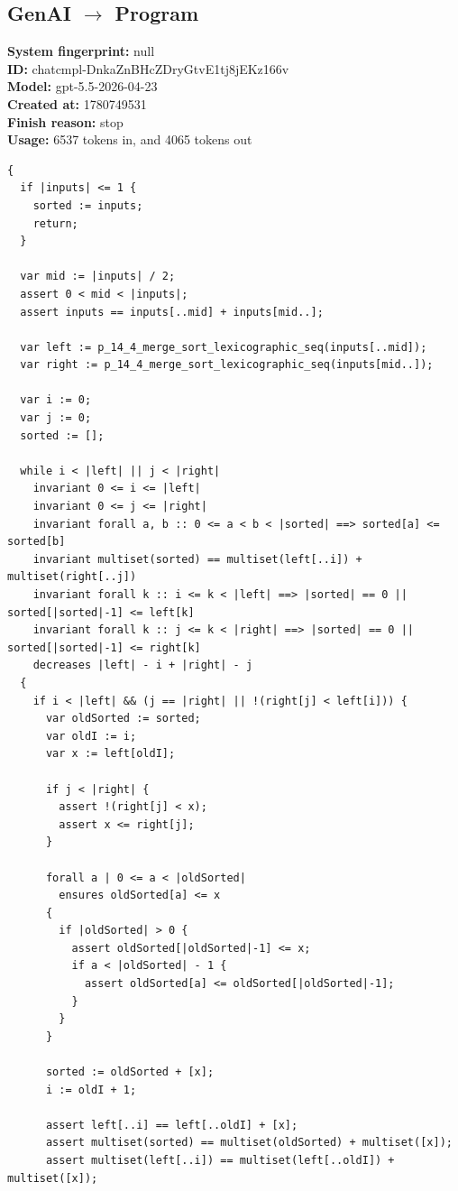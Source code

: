 \documentclass{article}
\begin{document}
\subsection*{GenAI $\rightarrow$ Program}
\textbf{System fingerprint: }null
\\\textbf{ID: }chatcmpl-DnkaZnBHcZDryGtvE1tj8jEKz166v
\\\textbf{Model: }gpt-5.5-2026-04-23
\\\textbf{Created at: }1780749531
\\\textbf{Finish reason: }stop
\\\textbf{Usage: }6537 tokens in, and 4065 tokens out
\begin{lstlisting}
{
  if |inputs| <= 1 {
    sorted := inputs;
    return;
  }

  var mid := |inputs| / 2;
  assert 0 < mid < |inputs|;
  assert inputs == inputs[..mid] + inputs[mid..];

  var left := p_14_4_merge_sort_lexicographic_seq(inputs[..mid]);
  var right := p_14_4_merge_sort_lexicographic_seq(inputs[mid..]);

  var i := 0;
  var j := 0;
  sorted := [];

  while i < |left| || j < |right|
    invariant 0 <= i <= |left|
    invariant 0 <= j <= |right|
    invariant forall a, b :: 0 <= a < b < |sorted| ==> sorted[a] <= sorted[b]
    invariant multiset(sorted) == multiset(left[..i]) + multiset(right[..j])
    invariant forall k :: i <= k < |left| ==> |sorted| == 0 || sorted[|sorted|-1] <= left[k]
    invariant forall k :: j <= k < |right| ==> |sorted| == 0 || sorted[|sorted|-1] <= right[k]
    decreases |left| - i + |right| - j
  {
    if i < |left| && (j == |right| || !(right[j] < left[i])) {
      var oldSorted := sorted;
      var oldI := i;
      var x := left[oldI];

      if j < |right| {
        assert !(right[j] < x);
        assert x <= right[j];
      }

      forall a | 0 <= a < |oldSorted|
        ensures oldSorted[a] <= x
      {
        if |oldSorted| > 0 {
          assert oldSorted[|oldSorted|-1] <= x;
          if a < |oldSorted| - 1 {
            assert oldSorted[a] <= oldSorted[|oldSorted|-1];
          }
        }
      }

      sorted := oldSorted + [x];
      i := oldI + 1;

      assert left[..i] == left[..oldI] + [x];
      assert multiset(sorted) == multiset(oldSorted) + multiset([x]);
      assert multiset(left[..i]) == multiset(left[..oldI]) + multiset([x]);


\end{lstlisting}
\end{document}
